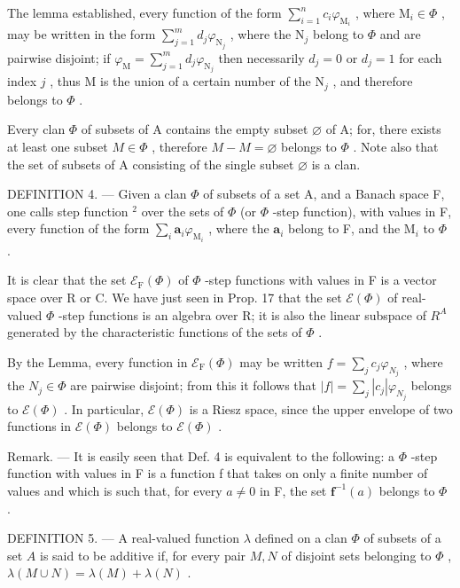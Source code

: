 The lemma established, every function of the form \(\sum_{i=1}^{n} c_i \varphi_{\mathrm{M}_i}\) , where \(\mathrm{M}_i \in \Phi\) , may be written in the form \(\sum_{j=1}^{m} d_j \varphi_{\mathrm{N}_j}\) , where the \(\mathrm{N}_j\) belong to \(\Phi\) and are pairwise disjoint; if \(\varphi_{\mathrm{M}} = \sum_{j=1}^{m} d_j \varphi_{\mathrm{N}_j}\) then necessarily \(d_j = 0\) or \(d_j = 1\) for each index \(j\) , thus \(\mathrm{M}\) is the union of a certain number of the \(\mathrm{N}_j\) , and therefore belongs to \(\Phi\) .

Every clan \(\Phi\) of subsets of A contains the empty subset \(\varnothing\) of A; for, there exists at least one subset \(M \in \Phi\) , therefore \(M - M = \varnothing\) belongs to \(\Phi\) . Note also that the set of subsets of A consisting of the single subset \(\varnothing\) is a clan.

DEFINITION 4. --- Given a clan \(\Phi\) of subsets of a set A, and a Banach space F, one calls step function \(^{2}\) over the sets of \(\Phi\) (or \(\Phi\) -step function), with values in F, every function of the form \(\sum_{i} \mathbf{a}_{i} \varphi_{\mathrm{M}_{i}}\) , where the \(\mathbf{a}_{i}\) belong to F, and the \(\mathrm{M}_{i}\) to \(\Phi\) .

It is clear that the set \(\mathcal{E}_{\mathrm{F}}(\Phi)\) of \(\Phi\) -step functions with values in F is a vector space over R or C. We have just seen in Prop. 17 that the set \(\mathcal{E}(\Phi)\) of real-valued \(\Phi\) -step functions is an algebra over R; it is also the linear subspace of \(R^{A}\) generated by the characteristic functions of the sets of \(\Phi\) .

By the Lemma, every function in \(\mathcal{E}_{\mathrm{F}}(\Phi)\) may be written \(f = \sum_{j} c_{j} \varphi_{N_{j}}\) , where the \(N_{j} \in \Phi\) are pairwise disjoint; from this it follows that \(|f| = \sum_{j} |c_{j}| \varphi_{N_{j}}\) belongs to \(\mathcal{E}(\Phi)\) . In particular, \(\mathcal{E}(\Phi)\) is a Riesz space, since the upper envelope of two functions in \(\mathcal{E}(\Phi)\) belongs to \(\mathcal{E}(\Phi)\) .

Remark. --- It is easily seen that Def. 4 is equivalent to the following: a \(\Phi\) -step function with values in F is a function f that takes on only a finite number of values and which is such that, for every \(a \neq 0\) in F, the set \(\mathbf{f}^{-1}(a)\) belongs to \(\Phi\) .

DEFINITION 5. --- A real-valued function \(\lambda\) defined on a clan \(\Phi\) of subsets of a set \(A\) is said to be additive if, for every pair \(M, N\) of disjoint sets belonging to \(\Phi\) , \(\lambda(M \cup N) = \lambda(M) + \lambda(N)\) .

